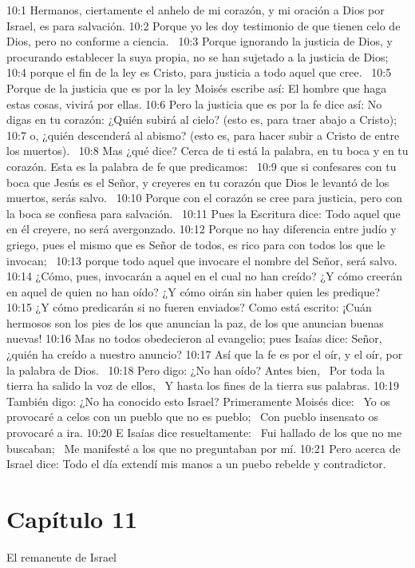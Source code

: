 10:1 Hermanos, ciertamente el anhelo de mi corazón, y mi oración a Dios por Israel, es para salvación. 
10:2 Porque yo les doy testimonio de que tienen celo de Dios, pero no conforme a ciencia.  
10:3 Porque ignorando la justicia de Dios, y procurando establecer la suya propia, no se han sujetado a la justicia de Dios;  
10:4 porque el fin de la ley es Cristo, para justicia a todo aquel que cree.  
10:5 Porque de la justicia que es por la ley Moisés escribe así: El hombre que haga estas cosas, vivirá por ellas. 
10:6 Pero la justicia que es por la fe dice así: No digas en tu corazón: ¿Quién subirá al cielo? (esto es, para traer abajo a Cristo);  
10:7 o, ¿quién descenderá al abismo? (esto es, para hacer subir a Cristo de entre los muertos).  
10:8 Mas ¿qué dice? Cerca de ti está la palabra, en tu boca y en tu corazón. Esta es la palabra de fe que predicamos:  
10:9 que si confesares con tu boca que Jesús es el Señor, y creyeres en tu corazón que Dios le levantó de los muertos, serás salvo.  
10:10 Porque con el corazón se cree para justicia, pero con la boca se confiesa para salvación.  
10:11 Pues la Escritura dice: Todo aquel que en él creyere, no será avergonzado. 
10:12 Porque no hay diferencia entre judío y griego, pues el mismo que es Señor de todos, es rico para con todos los que le invocan;  
10:13 porque todo aquel que invocare el nombre del Señor, será salvo. 
10:14 ¿Cómo, pues, invocarán a aquel en el cual no han creído? ¿Y cómo creerán en aquel de quien no han oído? ¿Y cómo oirán sin haber quien les predique?  
10:15 ¿Y cómo predicarán si no fueren enviados? Como está escrito: ¡Cuán hermosos son los pies de los que anuncian la paz, de los que anuncian buenas nuevas! 
10:16 Mas no todos obedecieron al evangelio; pues Isaías dice: Señor, ¿quién ha creído a nuestro anuncio? 
10:17 Así que la fe es por el oír, y el oír, por la palabra de Dios.  
10:18 Pero digo: ¿No han oído? Antes bien,  
Por toda la tierra ha salido la voz de ellos,  
Y hasta los fines de la tierra sus palabras. 
10:19 También digo: ¿No ha conocido esto Israel? Primeramente Moisés dice:  
Yo os provocaré a celos con un pueblo que no es pueblo;  
Con pueblo insensato os provocaré a ira. 
10:20 E Isaías dice resueltamente:  
Fui hallado de los que no me buscaban;  
Me manifesté a los que no preguntaban por mí. 
10:21 Pero acerca de Israel dice: Todo el día extendí mis manos a un puebo rebelde y contradictor. 
\section*{Capítulo 11}
El remanente de Israel  

